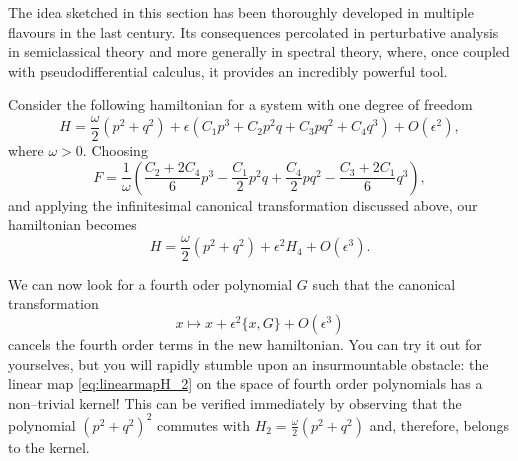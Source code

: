 \documentclass[english,fontsize=11pt,paper=a5,oneside]{scrbook}
\theoremstyle{definition}
\newenvironment{example}
  {\pushQED{\qed}\renewcommand{\qedsymbol}{$\lozenge$}\examplex}
  {\popQED\endexamplex}
\begin{document}
The idea sketched in this section has been thoroughly developed in multiple flavours in the last century.
Its consequences percolated in perturbative analysis in semiclassical theory and more generally in spectral theory, where, once coupled with pseudodifferential calculus, it provides an incredibly powerful tool.

\begin{example}
  Consider the following hamiltonian for a system with one degree of freedom
  \begin{equation}
    H = \frac\omega2 (p^2 + q^2) + \epsilon(C_1 p^3 + C_2 p^2 q + C_3 p q^2 + C_4 q^3) + O(\epsilon^2),
  \end{equation}
  where $\omega >0$.
  Choosing
  \begin{equation}
    F = \frac{1}{\omega}\left(
    \frac{C_2 + 2 C_4}{6} p^3
    - \frac {C_1}2 p^2 q
    + \frac{C_4}{2} p q^2
    -\frac{C_3 + 2 C_1}{6} q^3
    \right),
  \end{equation}
  and applying the infinitesimal canonical transformation discussed above, our hamiltonian becomes
  \begin{equation}
    H = \frac{\omega}{2}(p^2 + q^2) + \epsilon^2 H_4 + O(\epsilon^3).
  \end{equation}

  We can now look for a fourth oder polynomial $G$ such that the canonical transformation
  \begin{equation}
    x \mapsto x + \epsilon^2 \big\{x, G\big\} + O(\epsilon^3)
  \end{equation}
  cancels the fourth order terms in the new hamiltonian.
  You can try it out for yourselves, but you will rapidly stumble upon an insurmountable obstacle: the linear map \eqref{eq:linearmapH_2} on the space of fourth order polynomials has a non--trivial kernel! This can be verified immediately by observing that the polynomial $(p^2+q^2)^2$ commutes with $H_2=\frac\omega2(p^2+q^2)$ and, therefore, belongs to the kernel.
\end{example}
\end{document}
